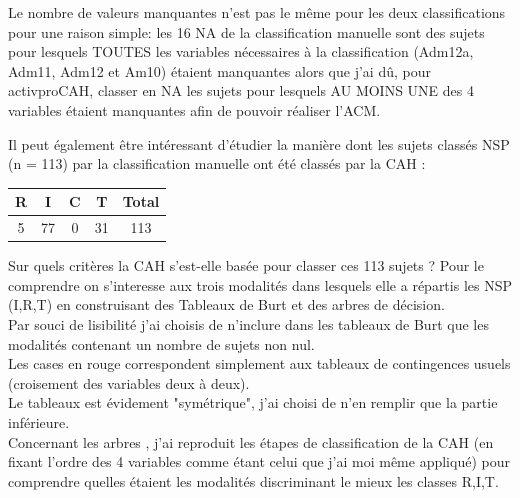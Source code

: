 \documentclass{book}
\begin{document}
\noindent
Le nombre de valeurs manquantes n'est pas le même pour les deux classifications pour une raison simple: les 16 NA de la classification manuelle sont des sujets pour lesquels TOUTES les variables nécessaires à la classification (Adm12a, Adm11, Adm12 et Am10) étaient manquantes alors que j'ai dû, pour activproCAH, classer en NA les sujets pour lesquels AU MOINS UNE des 4 variables étaient manquantes afin de pouvoir réaliser l'ACM.

\noindent
Il peut également être intéressant d'étudier la manière dont les sujets classés NSP (n = 113) par la classification manuelle ont été classés par la CAH :\\

\begin{center}
\setlength\arrayrulewidth{.5pt}
\begin{tabular}{|c|c|c|c||c|}
\hline
R & I & C & T & Total\\
\hline
5 & 77 & 0 & 31 & 113\\
\hline
\end{tabular}
\end{center}

\noindent
Sur quels critères la CAH s'est-elle basée pour classer ces 113 sujets ? 
Pour le comprendre on s'interesse aux trois modalités dans lesquels elle a répartis les NSP (I,R,T) en construisant des Tableaux de Burt et des arbres de décision.\\
Par souci de lisibilité j'ai choisis de n'inclure dans les tableaux de Burt que les modalités contenant un nombre de sujets non nul.\\
Les cases en rouge correspondent simplement aux tableaux de contingences usuels (croisement des variables deux à deux).\\
Le tableaux est évidement "symétrique", j'ai choisi de n'en remplir que la partie inférieure.\\
Concernant les arbres , j'ai reproduit les étapes de classification de la CAH (en fixant l'ordre des 4 variables comme étant celui que j'ai moi même appliqué) pour comprendre quelles étaient les modalités discriminant le mieux les classes R,I,T.\\
\end{document}
